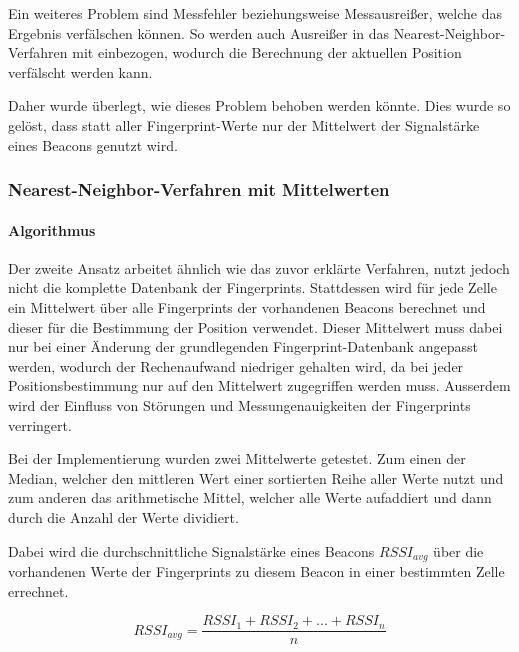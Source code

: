 Ein weiteres Problem sind Messfehler beziehungsweise Messausreißer, welche das Ergebnis verfälschen können. So werden auch Ausreißer in das Nearest-Neighbor-Verfahren mit einbezogen, wodurch die Berechnung der aktuellen Position verfälscht werden kann.

Daher wurde überlegt, wie dieses Problem behoben werden könnte. Dies wurde so gelöst, dass statt aller Fingerprint-Werte nur der Mittelwert der Signalstärke eines Beacons genutzt wird.


\subsubsection{Nearest-Neighbor-Verfahren mit Mittelwerten}
\label{sec:implementation:fingerprinting:positioning:avg}

\paragraph{Algorithmus}
\label{sec:implementation:fingerprinting:positioning:avg:algorithm}

Der zweite Ansatz arbeitet ähnlich wie das zuvor erklärte Verfahren, nutzt jedoch nicht die komplette Datenbank der Fingerprints. 
Stattdessen wird für jede Zelle ein Mittelwert über alle Fingerprints der vorhandenen Beacons berechnet und dieser für die Bestimmung der Position verwendet.
Dieser Mittelwert muss dabei nur bei einer Änderung der grundlegenden Fingerprint-Datenbank angepasst werden, wodurch der Rechenaufwand niedriger gehalten wird, da bei jeder Positionsbestimmung nur auf den Mittelwert zugegriffen werden muss.
Ausserdem wird der Einfluss von Störungen und Messungenauigkeiten der Fingerprints verringert.

Bei der Implementierung wurden zwei Mittelwerte getestet. Zum einen der Median, welcher den mittleren Wert einer sortierten Reihe aller Werte nutzt und zum anderen das arithmetische Mittel, welcher alle Werte aufaddiert und dann durch die Anzahl der Werte dividiert.

Dabei wird die durchschnittliche Signalstärke eines Beacons $RSSI_{avg}$ über die vorhandenen Werte der Fingerprints zu diesem Beacon in einer bestimmten Zelle errechnet.

\begin{equation}
	RSSI_{avg} = \frac{RSSI_{1} + RSSI_{2} + ... + RSSI_{n}}{n}
\end{equation}

